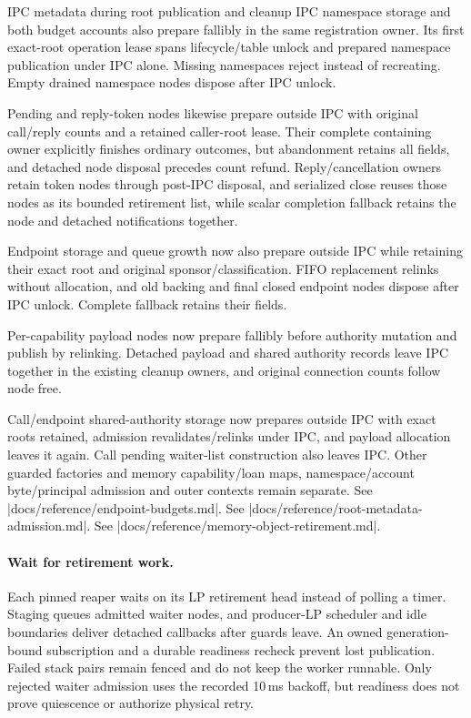 \begin{implementationdetail}{IPC metadata during root publication and cleanup}
IPC namespace storage and both budget accounts also prepare fallibly in the
same registration owner. Its first exact-root operation lease spans
lifecycle/table unlock and prepared namespace publication under IPC alone.
Missing namespaces reject instead of recreating. Empty drained namespace
nodes dispose after IPC unlock.

Pending and reply-token nodes likewise prepare outside IPC
with original call/reply counts and a retained caller-root lease. Their complete
containing owner explicitly finishes ordinary outcomes, but abandonment retains all
fields, and detached node disposal precedes count refund. Reply/cancellation
owners retain token nodes through post-IPC disposal, and serialized close reuses
those nodes as its bounded retirement list, while scalar completion fallback
retains the node and detached notifications together.

Endpoint storage and queue
growth now also prepare outside IPC while retaining their exact root and
original sponsor/classification. FIFO replacement relinks without allocation, and
old backing and final closed endpoint nodes dispose after IPC unlock. Complete
fallback retains their fields.

Per-capability payload nodes now prepare fallibly
before authority mutation and publish by relinking. Detached payload and shared
authority records leave IPC together in the existing cleanup owners, and original
connection counts follow node free.

Call/endpoint shared-authority storage now
prepares outside IPC with exact roots retained, admission revalidates/relinks
under IPC, and payload allocation leaves it again. Call pending waiter-list
construction also leaves IPC. Other guarded factories and memory capability/loan maps,
namespace/account byte/principal admission and outer
contexts remain separate. See
\repofile|docs/reference/endpoint-budgets.md|. See
\repofile|docs/reference/root-metadata-admission.md|. See
\repofile|docs/reference/memory-object-retirement.md|.
\end{implementationdetail}

\paragraph*{Wait for retirement work.}

Each pinned reaper waits on its LP retirement head instead of polling a timer.
Staging queues admitted waiter nodes, and producer-LP scheduler and idle boundaries
deliver detached callbacks after guards leave. An owned generation-bound subscription
and a durable readiness recheck prevent lost publication. Failed stack pairs
remain fenced and do not keep the worker runnable. Only rejected waiter
admission uses the recorded 10\,ms backoff, but readiness does not prove quiescence
or authorize physical retry.

